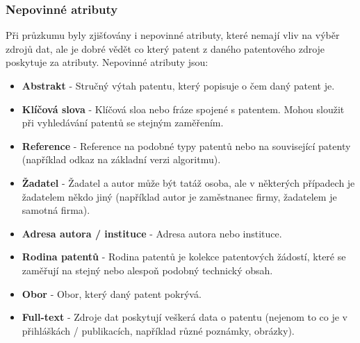 \subsubsection{Nepovinné atributy}
Při průzkumu byly zjišťovány i nepovinné atributy, které nemají vliv na výběr zdrojů dat, ale je dobré vědět co který patent z daného patentového zdroje poskytuje za atributy. Nepovinné atributy jsou:
\begin{itemize}
\item \textbf{Abstrakt} - Stručný výtah patentu, který popisuje o čem daný patent je.
\item \textbf{Klíčová slova} - Klíčová sloa nebo fráze spojené s patentem. Mohou sloužit při vyhledávání patentů se stejným zaměřením.
\item \textbf{Reference} - Reference na podobné typy patentů nebo na související patenty (například odkaz na základní verzi algoritmu).
\item \textbf{Žadatel} - Žadatel a autor může být tatáž osoba, ale v některých případech je žadatelem někdo jiný (například autor je zaměstnanec firmy, žadatelem je samotná firma).
\item \textbf{Adresa autora / instituce} - Adresa autora nebo instituce.
\item \textbf{Rodina patentů} - Rodina patentů je kolekce patentových žádostí, které se zaměřují na stejný nebo alespoň podobný technický obsah.
\item \textbf{Obor} - Obor, který daný patent pokrývá.
\item \textbf{Full-text} - Zdroje dat poskytují veškerá data o patentu (nejenom to co je v přihláškách / publikacích, například různé poznámky, obrázky).
\end{itemize}

